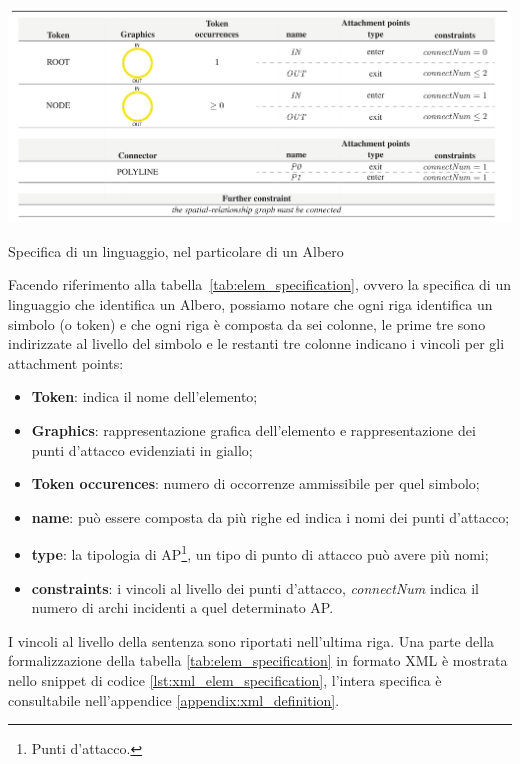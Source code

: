         \begin{table}[htbp]
            \centering
            \includegraphics[scale=0.35]{Figure/elem_specification.PNG}
            \caption{Specifica di un linguaggio, nel particolare di un Albero \cite{localcontext_recognition}}
            \label{tab:elem_specification}
        \end{table}
        \noindent
        Facendo riferimento alla tabella~\ref{tab:elem_specification}, ovvero la specifica di un linguaggio che identifica un Albero, possiamo notare che ogni riga identifica un simbolo (o token) e che ogni riga è composta da sei colonne, le prime tre sono indirizzate al livello del simbolo e le restanti tre colonne indicano i vincoli per gli attachment points:
        \begin{itemize}
            \item \textbf{Token}: indica il nome dell'elemento;
            \item \textbf{Graphics}: rappresentazione grafica dell'elemento e rappresentazione dei punti d'attacco evidenziati in giallo;
            \item \textbf{Token occurences}: numero di occorrenze ammissibile per quel simbolo;
            \item \textbf{name}: può essere composta da più righe ed indica i nomi dei punti d'attacco;
            \item \textbf{type}: la tipologia di AP\footnote{Punti d'attacco.}, un tipo di punto di attacco può avere più nomi;
            \item \textbf{constraints}: i vincoli al livello dei punti d'attacco, \textit{connectNum} indica il numero di archi incidenti a quel determinato AP.
        \end{itemize}
        I vincoli al livello della sentenza sono riportati nell'ultima riga. Una parte della formalizzazione della tabella \ref{tab:elem_specification} in formato XML è mostrata nello snippet di codice \ref{lst:xml_elem_specification}, l'intera specifica è consultabile nell'appendice \ref{appendix:xml_definition}.

